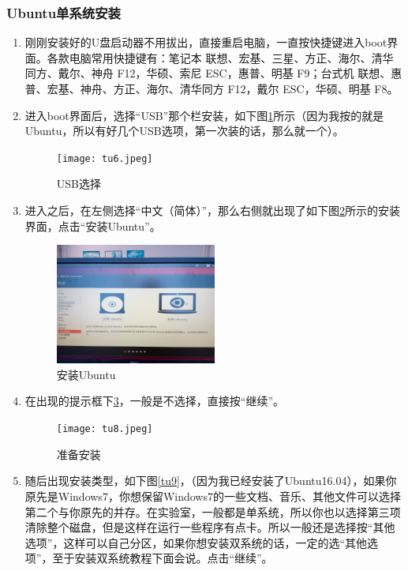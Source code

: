 \documentclass{article}
\begin{document}
\subsubsection{Ubuntu单系统安装}
\begin{enumerate}

\item  刚刚安装好的U盘启动器不用拔出，直接重启电脑，一直按快捷键进入boot界面。各款电脑常用快捷键有：笔记本 联想、宏基、三星、方正、海尔、清华同方、戴尔、神舟 F12，华硕、索尼 ESC，惠普、明基 F9；台式机 联想、惠普、宏基、神舟、方正、海尔、清华同方 F12，戴尔 ESC，华硕、明基 F8。

\item  进入boot界面后，选择“USB”那个栏安装，如下图\ref{tu6}所示（因为我按的就是Ubuntu，所以有好几个USB选项，第一次装的话，那么就一个）。

\begin{figure}[!htb] %
\centering
\texttt{[image: tu6.jpeg]}
\caption{\small USB选择}
\label{tu6}
\end{figure} 

\item  进入之后，在左侧选择“中文（简体）”，那么右侧就出现了如下图\ref{tu7}所示的安装界面，点击“安装Ubuntu”。

\begin{figure}[!htb] %
\centering
\includegraphics[width=0.5\textwidth]{tu7.jpeg}
\caption{\small 安装Ubuntu}
\label{tu7}
\end{figure}
 
\item   在出现的提示框下\ref{tu8}，一般是不选择，直接按“继续”。

\begin{figure}[!htb] %
\centering
\texttt{[image: tu8.jpeg]}
\caption{\small 准备安装}
\label{tu8}
\end{figure} 

\item  随后出现安装类型，如下图\ref{tu9}，（因为我已经安装了Ubuntu16.04），如果你原先是Windows7，你想保留Windows7的一些文档、音乐、其他文件可以选择第二个与你原先的并存。在实验室，一般都是单系统，所以你也以选择第三项清除整个磁盘，但是这样在运行一些程序有点卡。所以一般还是选择按“其他选项”，这样可以自己分区，如果你想安装双系统的话，一定的选{\color{red}“其他选项”}，至于安装双系统教程下面会说。点击“继续”。


\end{enumerate}
\end{document}
